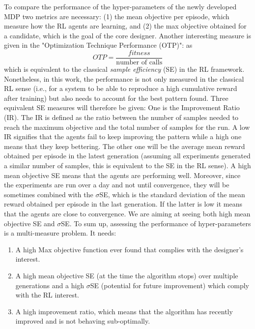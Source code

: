 \documentclass[a4paper]{article}
\begin{document}
To compare the performance of the hyper-parameters of the newly developed MDP two metrics are necessary: (1) the mean objective per episode, which measure how the RL agents are learning, and (2) the max objective obtained for a candidate, which is the goal of the core designer. Another interesting measure is given in \cite{francois2012comparison} the "Optimization Technique Performance (OTP)": as 
\begin{equation}
OTP = \frac{fitness}{\text{number of calls}}
\label{eq:otp}
\end{equation}
which is equivalent to the classical \textit{sample efficiency} (SE) in the RL framework. Nonetheless, in this work, the performance is not only measured in the classical RL sense (i.e., for a system to be able to reproduce a high cumulative reward after training) but also needs to account for the best pattern found. Three equivalent SE measures will therefore be given: One is the Improvement Ratio (IR). The IR is defined as the ratio between the number of samples needed to reach the maximum objective and the total number of samples for the run. A low IR signifies that the agents fail to keep improving the pattern while a high one means that they keep bettering. The other one will be the average mean reward obtained per episode in the latest generation (assuming all experiments generated a similar number of samples, this is equivalent to the SE in the RL sense). A high mean objective SE means that the agents are performing well. Moreover, since the experiments are run over a day and not until convergence, they will be sometimes combined with the $\sigma$SE, which is the standard deviation of the mean reward obtained per episode in the last generation. If the latter is low it means that the agents are close to convergence. We are aiming at seeing both high mean objective SE and $\sigma$SE.  To sum up, assessing the performance of hyper-parameters is a multi-measure problem. It needs:
\begin{enumerate}
    \item 
    A high Max objective function ever found that complies with the designer's interest.
    \item
    A high mean objective SE (at the time the algorithm stops) over multiple generations and a high $\sigma$SE (potential for future improvement) which comply with the RL interest.
    \item
    A high improvement ratio, which means that the algorithm has recently improved and is not behaving sub-optimally.
\end{enumerate}
\end{document}

